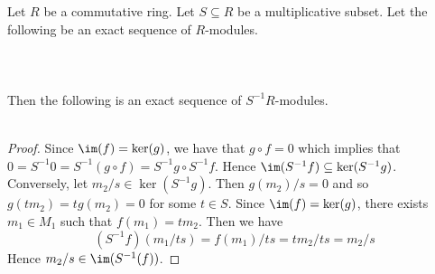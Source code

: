 \documentclass[a4paper]{article}
\begin{document}
\begin{prp}{}{} Let $R$ be a commutative ring. Let $S\subseteq R$ be a multiplicative subset. Let the following be an exact sequence of $R$-modules. \\~\\
\\~\\
Then the following is an exact sequence of $S^{-1}R$-modules. \\~\\
 \tcbline
\begin{proof}
Since $\im(f)=\ker(g)$, we have that $g\circ f=0$ which implies that $0=S^{-1}0=S^{-1}(g\circ f)=S^{-1}g\circ S^{-1}f$. Hence $\im(S^{-1}f)\subseteq\ker(S^{-1}g)$. Conversely, let $m_2/s\in\ker(S^{-1}g)$. Then $g(m_2)/s=0$ and so $g(tm_2)=tg(m_2)=0$ for some $t\in S$. Since $\im(f)=\ker(g)$, there exists $m_1\in M_1$ such that $f(m_1)=tm_2$. Then we have $$(S^{-1}f)(m_1/ts)=f(m_1)/ts=tm_2/ts=m_2/s$$ Hence $m_2/s\in\im(S^{-1}(f))$. 
\end{proof}
\end{prp}
\end{document}
